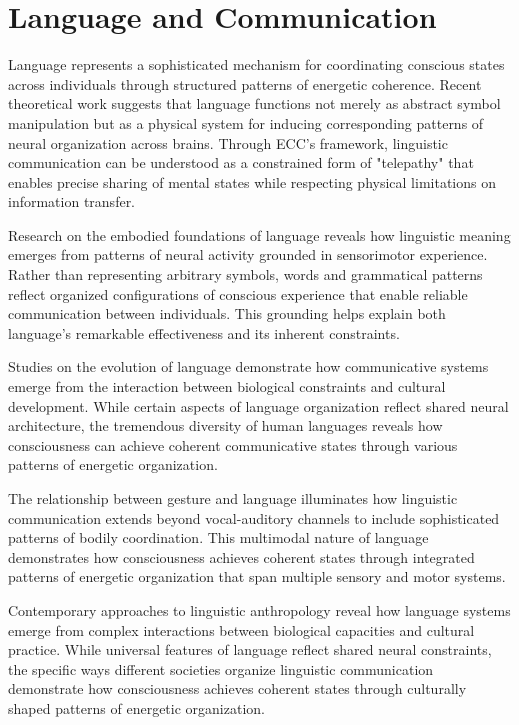 \section{Language and Communication}

Language represents a sophisticated mechanism for coordinating conscious states across individuals through structured patterns of energetic coherence. Recent theoretical work \cite{Feldman2008} suggests that language functions not merely as abstract symbol manipulation but as a physical system for inducing corresponding patterns of neural organization across brains. Through ECC's framework, linguistic communication can be understood as a constrained form of "telepathy" that enables precise sharing of mental states while respecting physical limitations on information transfer.

Research on the embodied foundations of language \cite{Barsalou2008} reveals how linguistic meaning emerges from patterns of neural activity grounded in sensorimotor experience. Rather than representing arbitrary symbols, words and grammatical patterns reflect organized configurations of conscious experience that enable reliable communication between individuals. This grounding helps explain both language's remarkable effectiveness and its inherent constraints.

Studies on the evolution of language \cite{Deacon1997} demonstrate how communicative systems emerge from the interaction between biological constraints and cultural development. While certain aspects of language organization reflect shared neural architecture, the tremendous diversity of human languages reveals how consciousness can achieve coherent communicative states through various patterns of energetic organization.

The relationship between gesture and language \cite{GoldinMeadow2003} illuminates how linguistic communication extends beyond vocal-auditory channels to include sophisticated patterns of bodily coordination. This multimodal nature of language demonstrates how consciousness achieves coherent states through integrated patterns of energetic organization that span multiple sensory and motor systems.

Contemporary approaches to linguistic anthropology \cite{Duranti2009} reveal how language systems emerge from complex interactions between biological capacities and cultural practice. While universal features of language reflect shared neural constraints, the specific ways different societies organize linguistic communication demonstrate how consciousness achieves coherent states through culturally shaped patterns of energetic organization.

